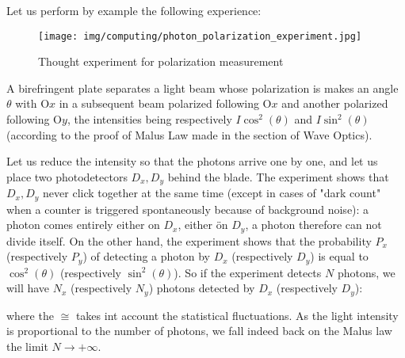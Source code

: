 	Let us perform by example the following experience:
	\begin{figure}[H]
		\centering
		\texttt{[image: img/computing/photon\_polarization\_experiment.jpg]}
		\caption{Thought experiment for polarization measurement}
	\end{figure}
	A birefringent plate separates a light beam whose polarization is makes an angle $\theta$ with O$x$ in a subsequent beam polarized  following O$x$ and another polarized following O$y$, the intensities being respectively $I\cos^2(\theta)$ and $I\sin^2(\theta)$ (according to the proof of Malus Law made in the section of Wave Optics).
	
	Let us reduce the intensity so that the photons arrive one by one, and let us place two photodetectors $D_x,D_y$ behind the blade. The experiment shows that $D_x,D_y$ never click together at the same time (except in cases of "dark count" when a counter is triggered spontaneously because of background noise): a photon comes entirely either on $D_x$, either ön $D_y$, a photon therefore can not divide itself. On the other hand, the experiment shows that the probability $P_x$ (respectively $P_y$) of detecting a photon by $D_x$ (respectively $D_y$) is equal to $\cos^2(\theta)$ (respectively $\sin^2(\theta)$). So if the experiment detects $N$ photons, we will have $N_x$ (respectively $N_y$) photons detected by $D_x$ (respectively $D_y$):
	
	where the $\cong$ takes int account the statistical fluctuations. As the light intensity is proportional to the number of photons, we fall indeed back on the Malus law the limit $N\rightarrow +\infty$.
	
